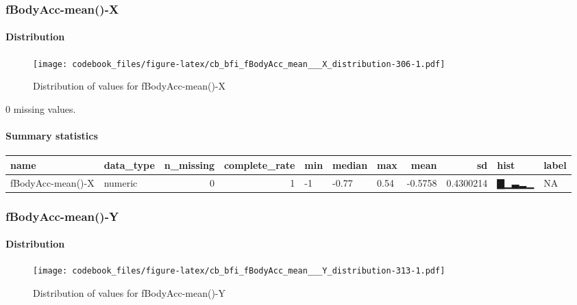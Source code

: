 \documentclass[
]{article}
\begin{document}
\hypertarget{fBodyAcc_mean___X}{%
\subsubsection{fBodyAcc-mean()-X}\label{fBodyAcc_mean___X}}

\hypertarget{fBodyAcc_mean___X_distribution}{%
\paragraph{Distribution}\label{fBodyAcc_mean___X_distribution}}

\begin{figure}
\centering
\texttt{[image: codebook\_files/figure-latex/cb\_bfi\_fBodyAcc\_mean\_\_\_X\_distribution-306-1.pdf]}
\caption{Distribution of values for fBodyAcc-mean()-X}
\end{figure}

0 missing values.

\hypertarget{fBodyAcc_mean___X_summary}{%
\paragraph{Summary statistics}\label{fBodyAcc_mean___X_summary}}

\begin{longtable}[]{@{}llrrlllrrll@{}}
\toprule
name & data\_type & n\_missing & complete\_rate & min & median & max &
mean & sd & hist & label \\
\midrule
\endhead
fBodyAcc-mean()-X & numeric & 0 & 1 & -1 & -0.77 & 0.54 & -0.5758 &
0.4300214 & ▇▁▃▂▁ & NA \\
\bottomrule
\end{longtable}

\hypertarget{fBodyAcc_mean___Y}{%
\subsubsection{fBodyAcc-mean()-Y}\label{fBodyAcc_mean___Y}}

\hypertarget{fBodyAcc_mean___Y_distribution}{%
\paragraph{Distribution}\label{fBodyAcc_mean___Y_distribution}}

\begin{figure}
\centering
\texttt{[image: codebook\_files/figure-latex/cb\_bfi\_fBodyAcc\_mean\_\_\_Y\_distribution-313-1.pdf]}
\caption{Distribution of values for fBodyAcc-mean()-Y}
\end{figure}
\end{document}

